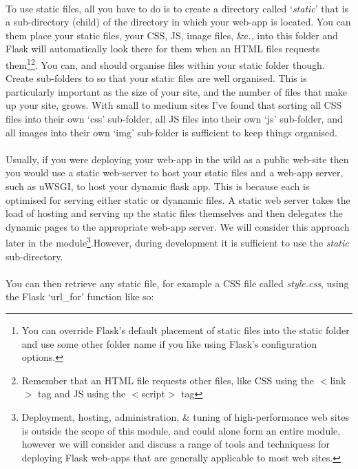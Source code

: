 \documentclass[12pt, a4paper, oneside]{book}
\begin{document}
\paragraph{} To use static files, all you have to do is to create a directory called `\emph{static}' that is a sub-directory (child) of the directory in which your web-app is located. You can them place your static files, your CSS, JS, image files, \&c., into this folder and Flask will automatically look there for them when an HTML files requests them\footnote{You can override Flask's default placement of static files into the static folder and use some other folder name if you like using Flask's configuration options.}\footnote{Remember that an HTML file requests other files, like CSS using the $<$link$>$ tag and JS using the $<$script$>$ tag}. You can, and should organise files within your static folder though. Create sub-folders to so that your static files are well organised. This is particularly important as the size of your site, and the number of files that make up your site, grows. With small to medium sites I've found that sorting all CSS files into their own `css' sub-folder, all JS files into their own `js' sub-folder, and all images into their own `img' sub-folder is sufficient to keep things organised.

\paragraph{} Usually, if you were deploying your web-app in the wild as a public web-site then you would use a static web-server to host your static files and a web-app server, such as uWSGI, to host your dynamic flask app. This is because each is optimised for serving either static or dyanamic files. A static web server takes the load of hosting and serving up the static files themselves and then delegates the dynamic pages to the appropriate web-app server. We will consider this approach later in the module\footnote{Deployment, hosting, administration, \& tuning of high-performance web sites is outside the scope of this module, and could alone form an entire module, however we will consider and discuss a range of tools and techniquess for deploying Flask web-apps that are generally applicable to most web sites.}.However, during development it is sufficient to use the \emph{static} sub-directory. 


\paragraph{} You can then retrieve any static file, for example a CSS file called \emph{style.css}, using the Flask `url\_for' function like so:
\end{document}
